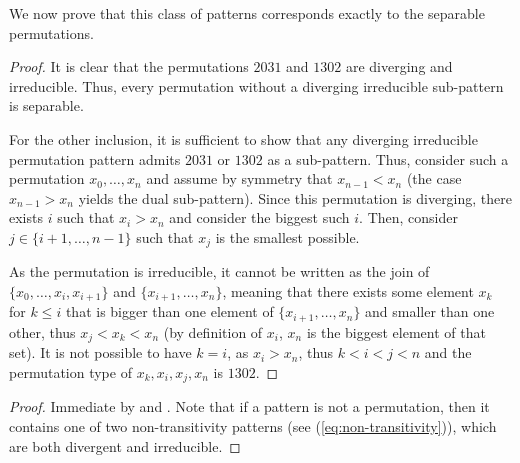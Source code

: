 \documentclass{article}
\numberwithin{theorem}{section}
\newtheorem{proposition}[theorem]{Proposition}
\newtheorem{corollary}[theorem]{Corollary}
\newcommand{\RT}[0]{\mathsf{RT}}
\begin{document}
We now prove that this class of patterns corresponds exactly to the separable permutations.


\begin{proof}
It is clear that the permutations $2031$ and $1302$ are diverging and irreducible.
Thus, every permutation without a diverging irreducible sub-pattern is separable.

For the other inclusion, it is sufficient to show that any diverging irreducible permutation pattern admits $2031$ or $1302$ as a sub-pattern. Thus, consider such a permutation $x_0, \dots, x_n$ and assume by symmetry that $x_{n-1} < x_n$ (the case $x_{n-1} > x_n$ yields the dual sub-pattern). Since this permutation is diverging, there exists $i$ such that $x_i > x_n$ and consider the biggest such $i$. Then, consider $j \in \{i+1, \dots, n-1\}$ such that $x_j$ is the smallest possible.

As the permutation is irreducible, it cannot be written as the join of $\{x_0, \dots,\allowbreak x_{i}, x_{i+1}\}$ and $\{x_{i+1}, \dots, x_n\}$, meaning that there exists some element $x_k$ for $k \leq i$ that is bigger than one element of $\{x_{i+1}, \dots, x_n\}$ and smaller than one other, thus $x_j < x_k < x_n$ (by definition of $x_i$, $x_n$ is the biggest element of that set). It is not possible to have $k = i$, as $x_i > x_n$, thus $k < i < j < n$ and the permutation type of $x_k, x_i, x_j, x_n$ is $1302$.
\end{proof}

\begin{proof}
Immediate by  and . Note that if a pattern is not a permutation, then it contains one of two non-transitivity patterns (see (\ref{eq:non-transitivity})), which are both divergent and irreducible.
\end{proof}
\end{document}
